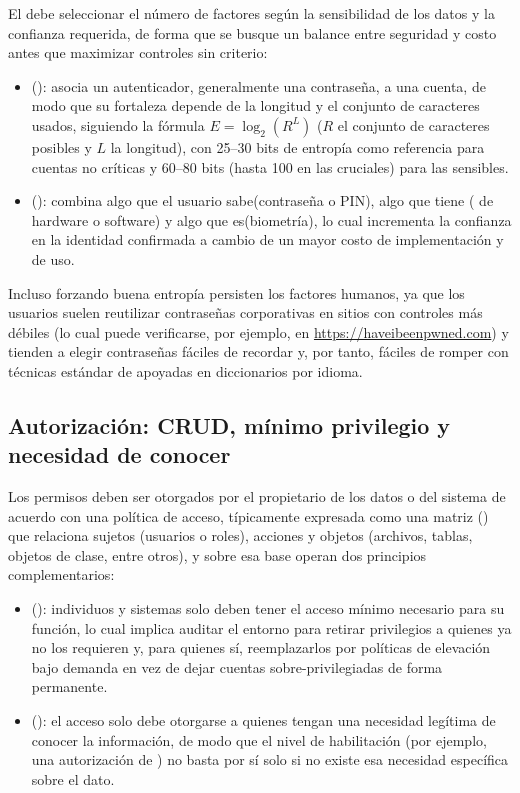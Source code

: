 El  debe seleccionar el número de factores según la sensibilidad de los datos y la confianza requerida, de forma que se busque un balance entre seguridad y costo antes que maximizar controles sin criterio:
\begin{itemize}
  \item {} (): asocia un autenticador, generalmente una contraseña, a una cuenta, de modo que su fortaleza depende de la longitud y el conjunto de caracteres usados, siguiendo la fórmula $E = \log_2(R^L)$ ($R$ el conjunto de caracteres posibles y $L$ la longitud), con 25--30 bits de entropía como referencia para cuentas no críticas y 60--80 bits (hasta 100 en las cruciales) para las sensibles.
  \item {} (): combina algo que el usuario sabe(contraseña o PIN), algo que tiene ( de hardware o software) y algo que es(biometría), lo cual incrementa la confianza en la identidad confirmada a cambio de un mayor costo de implementación y de uso.
\end{itemize}

Incluso forzando buena entropía persisten los factores humanos, ya que los usuarios suelen reutilizar contraseñas corporativas en sitios con controles más débiles (lo cual puede verificarse, por ejemplo, en \url{https://haveibeenpwned.com}) y tienden a elegir contraseñas fáciles de recordar y, por tanto, fáciles de romper con técnicas estándar de  apoyadas en diccionarios por idioma.

\subsection*{Autorización: CRUD, mínimo privilegio y necesidad de conocer}

Los permisos deben ser otorgados por el propietario de los datos o del sistema de acuerdo con una política de acceso, típicamente expresada como una matriz  () que relaciona sujetos (usuarios o roles), acciones y objetos (archivos, tablas, objetos de clase, entre otros), y sobre esa base operan dos principios complementarios:

\begin{itemize}
  \item {} (): individuos y sistemas
  solo deben tener el acceso mínimo necesario para su función, lo cual implica auditar el
  entorno para retirar privilegios a quienes ya no los requieren y, para quienes sí,
  reemplazarlos por políticas de elevación bajo demanda en vez de dejar cuentas
  sobre-privilegiadas de forma permanente.
  \item {} (): el acceso solo debe
  otorgarse a quienes tengan una necesidad legítima de conocer la información, de modo que el
  nivel de habilitación (por ejemplo, una autorización de ) no basta por sí
  solo si no existe esa necesidad específica sobre el dato.
\end{itemize}

